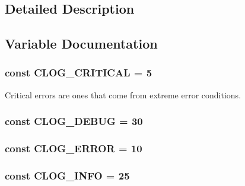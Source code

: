 \subsection{Detailed Description}


\subsection{Variable Documentation}
\hypertarget{group__log__levels_ga9e72f6a54bb75da33d3d8a8409cb9653}{
\subsubsection[{C\-L\-O\-G\-\_\-\-C\-R\-I\-T\-I\-C\-A\-L}]{\setlength{\rightskip}{0pt plus 5cm}const C\-L\-O\-G\-\_\-\-C\-R\-I\-T\-I\-C\-A\-L = 5}}\label{group__log__levels_ga9e72f6a54bb75da33d3d8a8409cb9653}
Critical errors are ones that come from extreme error conditions. \hypertarget{group__log__levels_ga7a20d07461d8da70f7ddccd254222419}{
\subsubsection[{C\-L\-O\-G\-\_\-\-D\-E\-B\-U\-G}]{\setlength{\rightskip}{0pt plus 5cm}const C\-L\-O\-G\-\_\-\-D\-E\-B\-U\-G = 30}}\label{group__log__levels_ga7a20d07461d8da70f7ddccd254222419}
\hypertarget{group__log__levels_gacd8b449d24550e76fa0b9682e816da94}{
\subsubsection[{C\-L\-O\-G\-\_\-\-E\-R\-R\-O\-R}]{\setlength{\rightskip}{0pt plus 5cm}const C\-L\-O\-G\-\_\-\-E\-R\-R\-O\-R = 10}}\label{group__log__levels_gacd8b449d24550e76fa0b9682e816da94}
\hypertarget{group__log__levels_gac0257446453fba0e349b1334d3a6c206}{
\subsubsection[{C\-L\-O\-G\-\_\-\-I\-N\-F\-O}]{\setlength{\rightskip}{0pt plus 5cm}const C\-L\-O\-G\-\_\-\-I\-N\-F\-O = 25}}\label{group__log__levels_gac0257446453fba0e349b1334d3a6c206}
